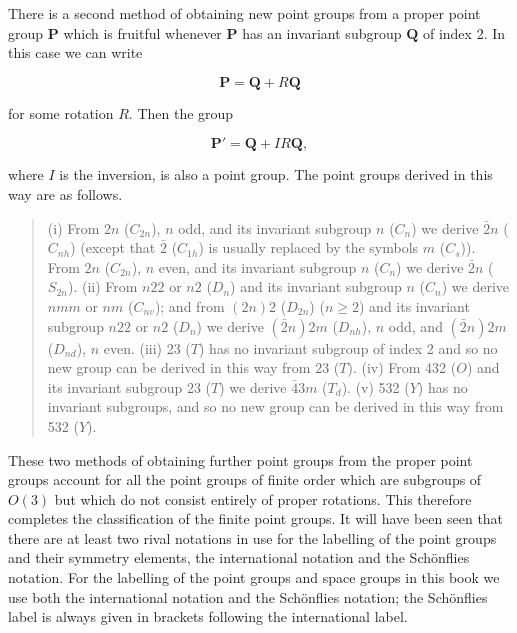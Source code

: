 \documentclass[11pt,a4paper,twoside,openright]{book}
\begin{document}
There is a second method of obtaining new point groups from a proper point group $\mathbf{P}$ which is fruitful whenever $\mathbf{P}$ has an invariant subgroup $\mathbf{Q}$ of index 2. In this case we can write

\begin{equation*}
\mathbf{P} = \mathbf{Q} + R\mathbf{Q} \tag{1.4.6}
\end{equation*}

for some rotation $R$. Then the group

\begin{equation*}
\mathbf{P}' = \mathbf{Q} + IR\mathbf{Q}, \tag{1.4.7}
\end{equation*}

where $I$ is the inversion, is also a point group. The point groups derived in this way are as follows.

\begin{quote}(i) From $2n$ ($C_{2n}$), $n$ odd, and its invariant subgroup $n$ ($C_{n}$) we derive $\bar{2}n$ ($C_{nh}$) (except that $\bar{2}$ ($C_{1h}$) is usually replaced by the symbols $m$ ($C_{s}$)). From $2n$ ($C_{2n}$), $n$ even, and its invariant subgroup $n$ ($C_{n}$) we derive $\bar{2}n$ ($S_{2n}$). (ii) From $n22$ or $n2$ ($D_{n}$) and its invariant subgroup $n$ ($C_{n}$) we derive $nmm$ or $nm$ ($C_{nv}$); and from $(2n)2$ ($D_{2n}$) ($n \geqslant 2$) and its invariant subgroup $n22$ or $n2$ ($D_{n}$) we derive $(\bar{2}n)2m$ ($D_{nh}$), $n$ odd, and $(\bar{2}n)2m$ ($D_{nd}$), $n$ even. (iii) 23 ($T$) has no invariant subgroup of index 2 and so no new group can be derived in this way from 23 ($T$). (iv) From 432 ($O$) and its invariant subgroup 23 ($T$) we derive $\bar{4}3m$ ($T_{d}$). (v) 532 ($Y$) has no invariant subgroups, and so no new group can be derived in this way from 532 ($Y$).\end{quote}

These two methods of obtaining further point groups from the proper point groups account for all the point groups of finite order which are subgroups of $O(3)$ but which do not consist entirely of proper rotations. This therefore completes the classification of the finite point groups. It will have been seen that there are at least two rival notations in use for the labelling of the point groups and their symmetry elements, the international notation and the Schönflies notation. For the labelling of the point groups and space groups in this book we use both the international notation and the Schönflies notation; the Schönflies label is always given in brackets following the international label.
\end{document}
